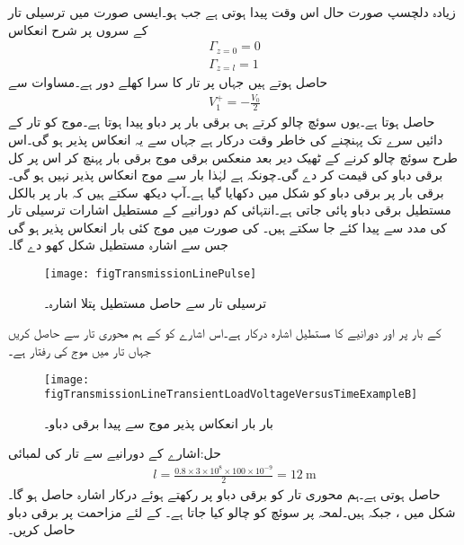 زیادہ دلچسپ صورت حال اس وقت پیدا ہوتی ہے جب  ہو۔ایسی صورت میں ترسیلی تار کے سروں پر شرح انعکاس
\begin{align*}
\Gamma_{z=0}=0\\
\Gamma_{z=l}=1
\end{align*}
حاصل ہوتے ہیں جہاں  پر تار کا سرا کھلے دور ہے۔مساوات  سے
\begin{align*}
V_1^+=-\frac{V_0}{2}
\end{align*}
حاصل ہوتا ہے۔یوں سوئچ چالو کرتے ہی برقی بار پر دباو  پیدا ہوتا ہے۔موج  کو تار کے دائیں سرے تک پہنچنے کی خاطر  وقت درکار ہے جہاں سے یہ انعکاس پذیر ہو گی۔اس طرح سوئچ چالو کرنے کے ٹھیک  دیر بعد منعکس برقی موج برقی بار پہنچ کر اس پر کل برقی دباو کی قیمت  کر دے گی۔چونکہ  ہے لہٰذا بار سے موج انعکاس پذیر نہیں ہو گی۔برقی بار پر برقی دباو کو شکل  میں دکھایا گیا ہے۔آپ دیکھ سکتے ہیں کہ بار پر بالکل مستطیل برقی دباو پائی جاتی ہے۔انتہائی کم دورانیے کے مستطیل اشارات ترسیلی تار کی مدد سے پیدا کئے جا سکتے ہیں۔ کی صورت میں موج کئی بار انعکاس پذیر ہو گی جس سے اشارہ مستطیل شکل کھو دے گا۔
\begin{figure}
\centering
\texttt{[image: figTransmissionLinePulse]}
\caption{ترسیلی تار سے حاصل مستطیل پتلا اشارہ۔}
\label{شکل_ترسیلی_تار_سے_حاصل_مستطیل_اشارہ}
\end{figure}


 کے بار پر  اور  دورانیے کا مستطیل اشارہ درکار ہے۔اس اشارے کو  کے ہم محوری تار سے حاصل کریں جہاں تار میں موج کی رفتار  ہے۔
\begin{figure}
\centering
\texttt{[image: figTransmissionLineTransientLoadVoltageVersusTimeExampleB]}
\caption{بار بار انعکاس پذیر موج سے پیدا برقی دباو۔}
\label{شکل_ترسیلی_تار_بار_بار_انعکاس}
\end{figure}

حل:اشارے کے دورانیے سے تار کی لمبائی
\begin{align*}
l=\frac{0.8 \times 3 \times 10^8 \times 100 \times 10^{-9}}{2}=\SI{12}{\meter}
\end{align*}
حاصل ہوتی ہے۔ہم محوری تار کو  برقی دباو پر رکھتے ہوئے درکار اشارہ حاصل ہو گا۔
شکل  میں ،   جبکہ  ہیں۔لمحہ  پر سوئچ کو چالو کیا جاتا ہے۔ کے لئے مزاحمت پر برقی دباو حاصل کریں۔

